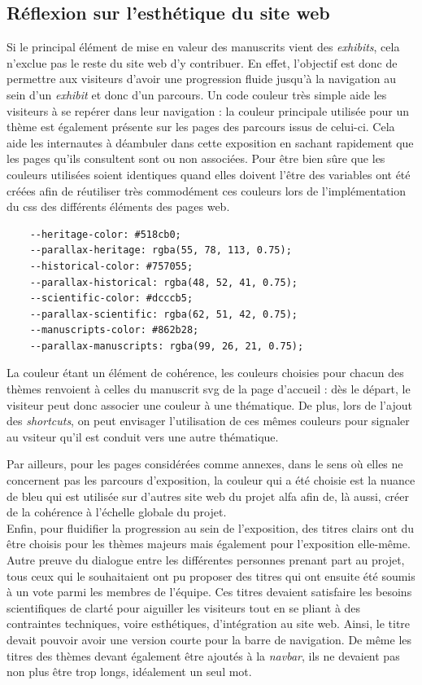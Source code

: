    \subsection{Réflexion sur l'esthétique du site web}
    Si le principal élément de mise en valeur des manuscrits vient des \textit{exhibits}, cela n'exclue pas le reste du site web d'y contribuer. En effet, l'objectif est donc de permettre aux visiteurs d'avoir une progression fluide jusqu'à la navigation au sein d'un \textit{exhibit} et donc d'un parcours. 
    Un code couleur très simple aide les visiteurs à se repérer dans leur navigation : la couleur principale utilisée pour un thème est également présente sur les pages des parcours issus de celui-ci. Cela aide les internautes à déambuler dans cette exposition en sachant rapidement que les pages qu'ils consultent sont ou non associées. Pour être bien sûre que les couleurs utilisées soient identiques quand elles doivent l'être des variables ont été créées afin de réutiliser très commodément ces couleurs lors de l'implémentation du \acrshort{css} des différents éléments des pages web. 
    
    \begin{verbatim}
    --heritage-color: #518cb0;
    --parallax-heritage: rgba(55, 78, 113, 0.75);
    --historical-color: #757055;
    --parallax-historical: rgba(48, 52, 41, 0.75);
    --scientific-color: #dcccb5;
    --parallax-scientific: rgba(62, 51, 42, 0.75);
    --manuscripts-color: #862b28;
    --parallax-manuscripts: rgba(99, 26, 21, 0.75);
    \end{verbatim}
    
    La couleur étant un élément de cohérence, les couleurs choisies pour chacun des thèmes renvoient à celles du manuscrit \acrshort{svg} de la page d'accueil : dès le départ, le visiteur peut donc associer une couleur à une thématique. De plus, lors de l'ajout des \textit{shortcuts}, on peut envisager l'utilisation de ces mêmes couleurs pour signaler au vsiteur qu'il est conduit vers une autre thématique.
    
    Par ailleurs, pour les pages considérées comme annexes, dans le sens où elles ne concernent pas les parcours d'exposition, la couleur qui a été choisie est la nuance de bleu qui est utilisée sur d'autres site web du projet \acrshort{alfa} afin de, là aussi, créer de la cohérence à l'échelle globale du projet. \\
    
    Enfin, pour fluidifier la progression au sein de l'exposition, des titres clairs ont du être choisis pour les thèmes majeurs mais également pour l'exposition elle-même. Autre preuve du dialogue entre les différentes personnes prenant part au projet, tous ceux qui le souhaitaient ont pu proposer des titres qui ont ensuite été soumis à un vote parmi les membres de l'équipe. Ces titres devaient satisfaire les besoins scientifiques de clarté pour aiguiller les visiteurs tout en se pliant à des contraintes techniques, voire esthétiques, d'intégration au site web. Ainsi, le titre devait pouvoir avoir une version courte pour la barre de navigation. De même les titres des thèmes devant également être ajoutés à la \textit{navbar}, ils ne devaient pas non plus être trop longs, idéalement un seul mot.

